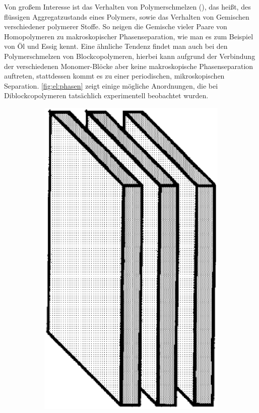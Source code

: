 Von großem Interesse ist das Verhalten von Polymerschmelzen (), das heißt, des flüssigen Aggregatzustands eines Polymers, sowie das Verhalten von Gemischen verschiedener polymerer Stoffe.
So neigen die Gemische vieler Paare von Homopolymeren zu makroskopischer Phasenseparation, wie man es zum Beispiel von Öl und Essig kennt.
Eine ähnliche Tendenz findet man auch bei den Polymerschmelzen von Blockcopolymeren, hierbei kann aufgrund der Verbindung der verschiedenen Monomer-Blöcke aber keine makroskopische Phasenseparation auftreten, stattdessen kommt es zu einer periodischen, mikroskopischen Separation.
\cref{fig:el:phasen} zeigt einige mögliche Anordnungen, die bei Diblockcopolymeren tatsächlich experimentell beobachtet wurden.

\begin{figure}[tb]
    \centering
    \begin{subfigure}[b]{0.18\textwidth}
        \includegraphics[width=\textwidth]{figures/einleitung/fig1}

\end{subfigure}
\end{figure}
